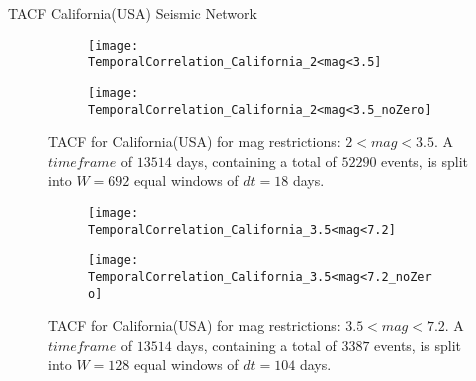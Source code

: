 \begin{frame}{TACF California(USA) Seismic Network}
\begin{figure}[!ht]
\begin{subfigure}{.5\textwidth}
  \centering
  \texttt{[image: TemporalCorrelation\_California\_2<mag<3.5]}
  \label{fig:corrCalifornia2_3.5}
\end{subfigure}%
\begin{subfigure}{.5\textwidth}
  \centering
  \texttt{[image: TemporalCorrelation\_California\_2<mag<3.5\_noZero]}
  \label{fig:corrCalifornia2_3.5_noZero}
\end{subfigure}
\caption{TACF for California(USA) for mag restrictions: $2<mag<3.5$. A $timeframe$ of $13514$ days, containing a total of $52290$ events, is split into $W=692$ equal windows of $dt=18$ days.}
\label{fig:corrCalifornia2_3.5!}
\end{figure}

\begin{figure}[!ht]
\begin{subfigure}{.5\textwidth}
  \centering
  \texttt{[image: TemporalCorrelation\_California\_3.5<mag<7.2]}
  \label{fig:corrCalifornia3.5_7}
\end{subfigure}%
\begin{subfigure}{.5\textwidth}
  \centering
  \texttt{[image: TemporalCorrelation\_California\_3.5<mag<7.2\_noZero]}
  \label{fig:corrCalifornia3.5_7_noZero}
\end{subfigure}
\caption{TACF for California(USA) for mag restrictions: $3.5<mag<7.2$. A $timeframe$ of $13514$ days, containing a total of $3387$ events, is split into $W=128$ equal windows of $dt=104$ days.}
\label{fig:corrCalifornia3.5_7!}
\end{figure}
\end{frame}


